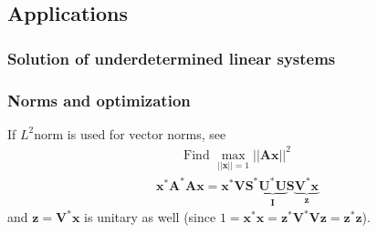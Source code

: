 \documentclass[letterpaper,10pt,english]{jupyterBook}
\begin{document}
\subsection{Applications}
\label{\detokenize{ch/linear-algebra/svd:applications}}\label{\detokenize{ch/linear-algebra/svd:math-svd-applications}}

\subsubsection{Solution of under\sphinxhyphen{}determined linear systems}
\label{\detokenize{ch/linear-algebra/svd:solution-of-under-determined-linear-systems}}

\subsubsection{Norms and optimization}
\label{\detokenize{ch/linear-algebra/svd:norms-and-optimization}}
\sphinxAtStartPar
If \(L^2\)\sphinxhyphen{}norm is used for vector norms, see {\hyperref[\detokenize{ch/linear-algebra/svd:svd-optimization-norm}]{}}
\begin{equation*}
\begin{split}\text{Find } \max_{||\mathbf{x}||=1} ||\mathbf{A} \mathbf{x}||^2\end{split}
\end{equation*}\begin{equation*}
\begin{split}\mathbf{x}^* \mathbf{A}^* \mathbf{A} \mathbf{x} = \mathbf{x}^* \mathbf{V} \mathbf{S}^* \underbrace{\mathbf{U}^* \mathbf{U}}_{\mathbf{I}} \mathbf{S} \underbrace{\mathbf{V}^* \mathbf{x}}_{\mathbf{z}}\end{split}
\end{equation*}
\sphinxAtStartPar
and \(\mathbf{z} = \mathbf{V}^* \mathbf{x}\) is unitary as well (since \(1= \mathbf{x}^* \mathbf{x} = \mathbf{z}^* \mathbf{V}^* \mathbf{V} \mathbf{z} = \mathbf{z}^* \mathbf{z} \)).
\end{document}
